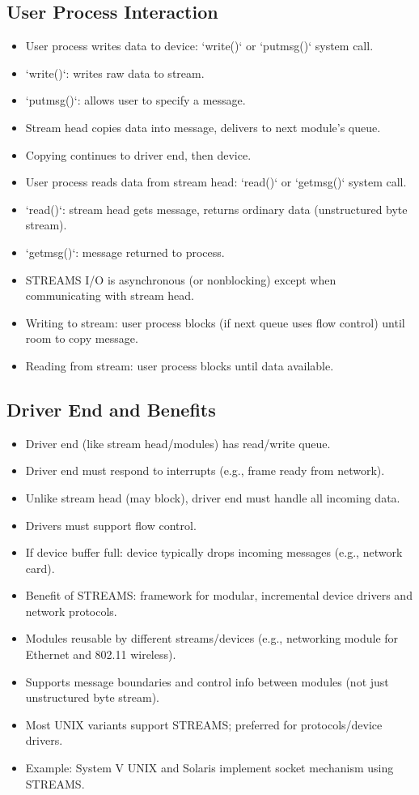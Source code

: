 \subsection{User Process Interaction}
\begin{itemize}
    \item User process writes data to device: `write()` or `putmsg()` system call.
    \item `write()`: writes raw data to stream.
    \item `putmsg()`: allows user to specify a message.
    \item Stream head copies data into message, delivers to next module's queue.
    \item Copying continues to driver end, then device.
    \item User process reads data from stream head: `read()` or `getmsg()` system call.
    \item `read()`: stream head gets message, returns ordinary data (unstructured byte stream).
    \item `getmsg()`: message returned to process.
    \item STREAMS I/O is asynchronous (or nonblocking) except when communicating with stream head.
    \item Writing to stream: user process blocks (if next queue uses flow control) until room to copy message.
    \item Reading from stream: user process blocks until data available.
\end{itemize}

\subsection{Driver End and Benefits}
\begin{itemize}
    \item Driver end (like stream head/modules) has read/write queue.
    \item Driver end must respond to interrupts (e.g., frame ready from network).
    \item Unlike stream head (may block), driver end must handle all incoming data.
    \item Drivers must support flow control.
    \item If device buffer full: device typically drops incoming messages (e.g., network card).
    \item Benefit of STREAMS: framework for modular, incremental device drivers and network protocols.
    \item Modules reusable by different streams/devices (e.g., networking module for Ethernet and 802.11 wireless).
    \item Supports message boundaries and control info between modules (not just unstructured byte stream).
    \item Most UNIX variants support STREAMS; preferred for protocols/device drivers.
    \item Example: System V UNIX and Solaris implement socket mechanism using STREAMS.
\end{itemize}

